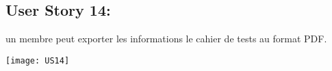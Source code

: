 \newpage{}
\subsection{User Story 14:}
un membre peut exporter les informations le cahier de tests au format PDF.


  \begin{center}
        \texttt{[image: US14]}
  \end{center}